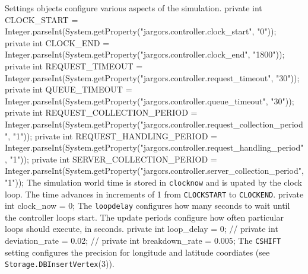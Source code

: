  Settings objects configure various aspects of the simulation.
\nwenddocs{}\endmoddef{}
private int CLOCK_START =
    Integer.parseInt(System.getProperty("jargors.controller.clock_start", "0"));
private int CLOCK_END =
    Integer.parseInt(System.getProperty("jargors.controller.clock_end", "1800"));
private int REQUEST_TIMEOUT =
    Integer.parseInt(System.getProperty("jargors.controller.request_timeout", "30"));
private int QUEUE_TIMEOUT =
    Integer.parseInt(System.getProperty("jargors.controller.queue_timeout", "30"));
private int REQUEST_COLLECTION_PERIOD =
    Integer.parseInt(System.getProperty("jargors.controller.request_collection_period", "1"));
private int REQUEST_HANDLING_PERIOD =
    Integer.parseInt(System.getProperty("jargors.controller.request_handling_period", "1"));
private int SERVER_COLLECTION_PERIOD =
    Integer.parseInt(System.getProperty("jargors.controller.server_collection_period", "1"));
\nwendcode{}\nwdocspar
The simulation world time is stored in {\tt{}clock{}now} and is upated by the
clock loop. The time advances in increments of 1 from {\tt{}CLOCK{}START}
to {\tt{}CLOCK{}END}.
\nwenddocs{}\plusendmoddef
private int clock_now = 0;
\nwendcode{}\nwdocspar
The {\tt{}loop{}delay} configures how many seconds to wait until the controller
loops start. The update periods configure how often particular loops should
execute, in seconds.
\nwenddocs{}\plusendmoddef
private int loop_delay = 0;
// private int deviation_rate = 0.02;
// private int breakdown_rate = 0.005;
\nwendcode{}\nwdocspar
The {\tt{}CSHIFT} setting configures the precision for longitude and latitude
coordiates (see {\tt{}Storage.\protect{}DBInsertVertex}(3)).

